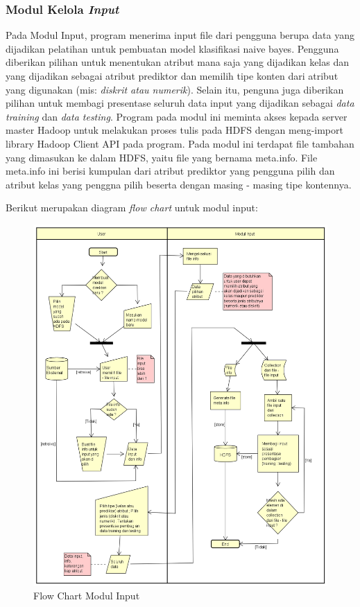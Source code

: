 \subsubsection{Modul Kelola \textit{Input}}

Pada Modul Input, program menerima input file dari pengguna berupa data yang dijadikan pelatihan untuk pembuatan model klasifikasi naive bayes. Pengguna diberikan pilihan untuk menentukan atribut mana saja yang dijadikan kelas dan yang dijadikan sebagai atribut prediktor dan memilih tipe konten dari atribut yang digunakan (mis: \textit{diskrit atau numerik}). Selain itu, penguna juga diberikan pilihan untuk membagi presentase seluruh data input yang dijadikan sebagai \textit{data training} dan \textit{data testing}. Program pada modul ini meminta akses kepada server master Hadoop untuk melakukan proses tulis pada HDFS dengan meng-import library Hadoop Client API pada program. Pada modul ini terdapat file tambahan yang dimasukan ke dalam HDFS, yaitu file yang bernama meta.info. File meta.info ini berisi kumpulan dari atribut prediktor yang pengguna pilih dan atribut kelas yang penggna pilih beserta dengan masing - masing tipe kontennya.

Berikut merupakan diagram \textit{flow chart} untuk modul input:

\begin{figure}[H]
	\centering
	\label{fig:flow_input}
	\includegraphics[scale=0.55]{Diagram/Flowchart_Input}
	\caption[Flow Chart Modul Input]{Flow Chart Modul Input}
	\label{fig:Flow Chart Modul Input}
\end{figure}

